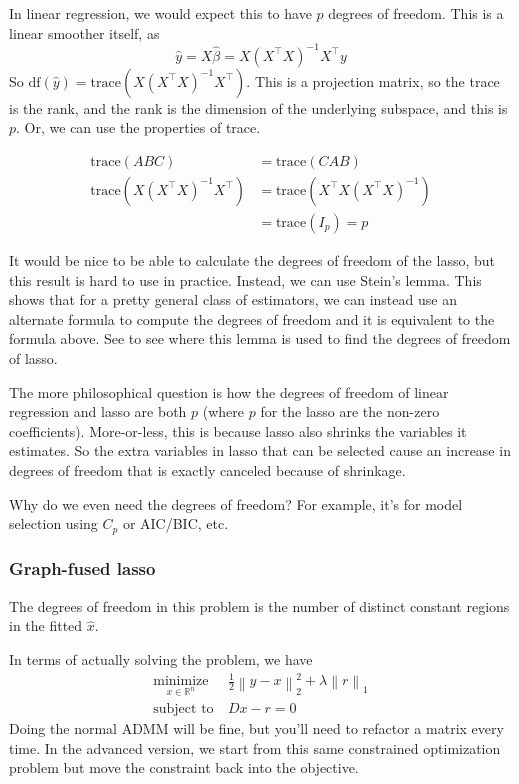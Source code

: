 \documentclass{article}
\newcommand{\op}[2]{{\ensuremath{\underset{ #2 }{\operatorname{ #1 }}~}}}
\newcommand{\norm}[1]{{ \ensuremath{ \left\lVert  #1 \right\rVert  }  }}
\begin{document}
In linear regression, we would expect this to have $p$ degrees of freedom. This is a linear smoother itself, as
$$\hat{y}=X\hat{\beta}=X(X^\top X)^{-1}X^\top y$$
So $\textrm{df}(\hat{y})=\textrm{trace}(X(X^\top X)^{-1}X^\top)$. This is a
projection matrix, so the trace is the rank, and the rank is the dimension of the
underlying subspace, and this is $p$. Or, we can use the properties of trace.

\begin{align*}
\textrm{trace}(ABC)&=\textrm{trace}(CAB)\\
\textrm{trace}(X(X^\top X)^{-1}X^\top)&=\textrm{trace}(X^\top X(X^\top X)^{-1})\\
&=\textrm{trace}(I_p)=p
\end{align*}

It would be nice to be able to calculate the degrees of freedom of the lasso, but
this result is hard to use in practice. Instead, we can use Stein's lemma.
This shows that for a pretty general class of estimators, we can instead
use an alternate formula to compute the degrees of freedom and it is equivalent
to the formula above. See \cite{zou2007degrees} to see where this lemma
is used to find the degrees of freedom of lasso.

The more philosophical question is how the degrees of freedom of linear
regression and lasso are both $p$ (where $p$ for the lasso are the non-zero coefficients). More-or-less, this is because lasso also shrinks the variables
it estimates. So the extra variables in lasso that can be selected cause an 
increase in degrees of freedom that is exactly
canceled because of shrinkage.

Why do we even need the degrees of freedom? For example, it's for model
selection using $C_p$ or AIC/BIC, etc.

\subsubsection{Graph-fused lasso}
The degrees of freedom in this problem is the number of distinct constant
regions in the fitted $\hat{x}$.

In terms of actually solving the problem, we have
\begin{align*}
\op{minimize}{x\in \mathbb{R}^n}&  \frac{1}{2}\norm{y-x}_2^2 + \lambda \norm{r}_1\\
\textrm{subject to}~& Dx-r=0
\end{align*}
Doing the normal ADMM will be fine, but you'll need to refactor a matrix
every time. In the advanced version, we start from this same constrained
optimization problem but move the constraint back into the objective.
\end{document}
